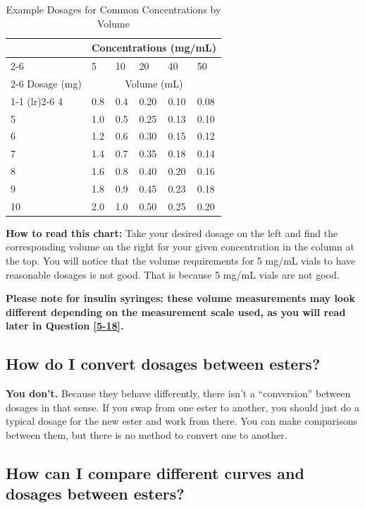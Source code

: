 \documentclass{article}
\begin{document}
\begin{table}
\centering
\caption{Example Dosages for Common Concentrations by Volume}
\label{tab:concentrations}
\begin{tabular}{@{}llllll@{}}
  \toprule
  \multicolumn{1}{c}{} & \multicolumn{5}{c}{Concentrations (mg/mL)} \\
  \cmidrule(rl){2-6}
            & 5    & 10  & 20 & 40 & 50   \\
            \cmidrule(rl){2-6}
Dosage (mg) & \multicolumn{5}{c}{Volume (mL)}  \\
    \cmidrule(r){1-1} \cmidrule(lr){2-6}
4        & 0.8  & 0.4 & 0.20  & 0.10 & 0.08\\
5        & 1.0    & 0.5 & 0.25 & 0.13 &  0.10\\
6        & 1.2  & 0.6   & 0.30  & 0.15 & 0.12   \\
7        & 1.4  & 0.7 & 0.35  & 0.18 & 0.14\\
8        & 1.6  & 0.8   & 0.40  & 0.20 & 0.16  \\
9        & 1.8  & 0.9 & 0.45  & 0.23 & 0.18\\
10       & 2.0    & 1.0   & 0.50  & 0.25 & 0.20 \\
  \bottomrule
\end{tabular}
\end{table}

\textbf{How to read this chart:} Take your desired dosage on the left and find the corresponding volume on the right for your given concentration in the column at the top. You will notice that the volume requirements for 5 mg/mL vials to have reasonable dosages is not good. That is because 5 mg/mL vials are not good.

\textbf{Please note for insulin syringes: these volume measurements may look different depending on the measurement scale used, as you will read later in Question \ref{5-18}.}

\subsection{How do I convert dosages between esters?}

\textbf{You don’t.} Because they behave differently, there isn’t a “conversion” between dosages in that sense. If you swap from one ester to another, you should just do a typical dosage for the new ester and work from there. You can make comparisons between them, but there is no method to convert one to another.

\subsection{How can I compare different curves and dosages between esters?}
\end{document}
